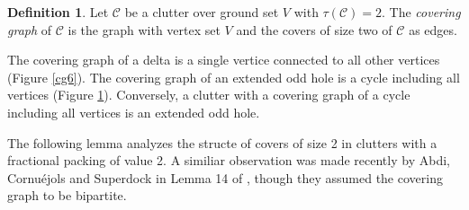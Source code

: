 \documentclass[a4paper, 12pt]{scrbook}
\theoremstyle{definition}
\newtheorem*{definition}{Definition}
\begin{document}
   \begin{definition}
       Let $\mathcal{C}$ be a clutter over ground set $V$ with $\tau(\mathcal{C})=2$.
       The \emph{covering graph} of $\mathcal{C}$ is the graph with vertex set $V$ and the covers of size two of $\mathcal{C}$ as edges.
   \end{definition}
   The covering graph of a delta is a single vertice connected to all other vertices (Figure \ref*{cg6}).
   The covering graph of an extended odd hole is a cycle including all vertices (Figure \ref*{cg5}). Conversely, a clutter with a covering graph of a cycle including all vertices is an extended odd hole.

    \begin{figure}[h]
        \centering
        \begin{minipage}{.4\textwidth}
            \centering
            \label{cg6}
        \end{minipage}
        \begin{minipage}{.5\textwidth}
            \centering
            \label{cg5}
        \end{minipage}
    \end{figure}

    The following lemma analyzes the structe of covers of size 2 in clutters with a fractional packing of value 2. A similiar observation was made recently by Abdi, Cornuéjols and Superdock in Lemma 14 of \cite{lemma}, though they assumed the covering graph to be bipartite.
\end{document}
